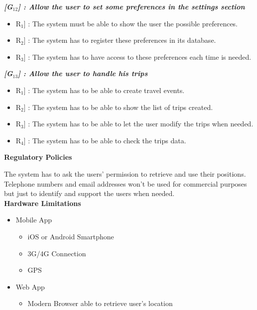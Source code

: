 \vspace{0.5cm}
\noindent
\emph{\textbf{[G$_{12}$] : Allow the user to set some preferences in the settings section}}
\begin{itemize}
	\setlength{\leftskip}{0.5cm}
	\item \lbrack R$_{1}$] : The system must be able to show the user the possible preferences.
	\item \lbrack R$_{2}$] : The system has to register these preferences in its database.
	\item \lbrack R$_{3}$] : The system has to have access to these preferences each time is needed.
\end{itemize}

\vspace{0.5cm}
\noindent
\emph{\textbf{[G$_{13}$] : Allow the user to handle his trips}}
\begin{itemize}
	\setlength{\leftskip}{0.5cm}
	\item \lbrack R$_{1}$] : The system has to be able to create travel events.
	\item \lbrack R$_{2}$] : The system has to be able to show the list of trips created.
	\item \lbrack R$_{3}$] : The system has to be able to let the user modify the trips when needed.
	\item \lbrack R$_{4}$] : The system has to be able to check the trips data.
\end{itemize}

\vspace{0.5cm}
\textbf{Regulatory Policies}
\vspace{0.5cm}\par
The system has to ask the users' permission to retrieve and use their positions. Telephone numbers and email addresses won't be used for commercial purposes but just to identify and support the users when needed.
\vspace{0.5cm}\\
\indent \textbf{Hardware Limitations}
\vspace{0.2cm}
\begin{itemize}
	\setlength{\leftskip}{0.5cm}
	\item Mobile App
		\begin{itemize}
			\setlength{\leftskip}{1cm}
			\item iOS or Android Smartphone
			\item 3G/4G Connection
			\item GPS
		\end{itemize}
	\item Web App
		\begin{itemize}
			\setlength{\leftskip}{1cm}
			\item Modern Browser able to retrieve user's location
		\end{itemize}
\end{itemize}

